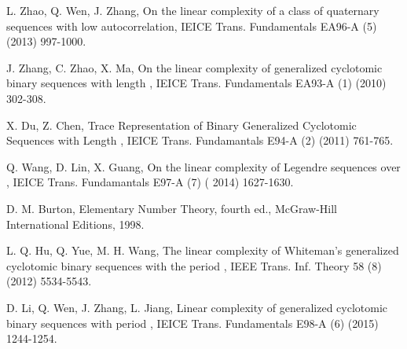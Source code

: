 \documentclass{mcom-l}
\theoremstyle{definition}
\numberwithin{equation}{section}
\begin{document}
\begin{thebibliography}{99}
 L. Zhao, Q. Wen,  J. Zhang,   On the linear complexity of a class of quaternary sequences with low autocorrelation, IEICE Trans. Fundamentals EA96-A (5) (2013) 997-1000.

 J. Zhang, C. Zhao,  X. Ma,  On the linear complexity of generalized cyclotomic binary sequences with length , IEICE Trans. Fundamentals EA93-A (1) (2010) 302-308.

 X. Du,  Z. Chen,  Trace Representation of Binary Generalized Cyclotomic Sequences with Length , IEICE Trans. Fundamantals E94-A (2) (2011) 761-765.

 Q. Wang, D. Lin,  X. Guang, On the linear complexity of Legendre sequences over , IEICE Trans. Fundamantals E97-A (7) ( 2014) 1627-1630.

 D. M. Burton, Elementary Number Theory, fourth ed., McGraw-Hill International Editions, 1998.

L. Q. Hu, Q. Yue,  M. H. Wang, The linear complexity of Whiteman\textquoteright s generalized cyclotomic binary sequences with the period , IEEE Trans. Inf. Theory 58 (8) (2012) 5534-5543.

D. Li, Q. Wen, J. Zhang,  L. Jiang, Linear complexity of generalized cyclotomic binary sequences with period , IEICE Trans. Fundamentals E98-A (6) (2015) 1244-1254.
\end{thebibliography}
\end{document}
